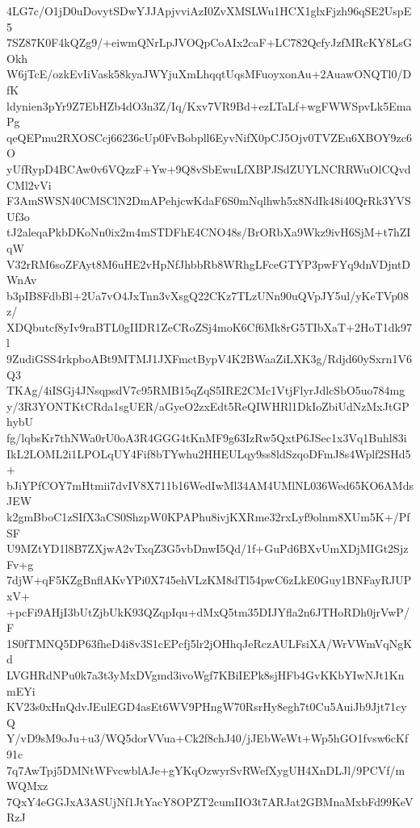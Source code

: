 4LG7c/O1jD0uDovytSDwYJJApjvviAzI0ZvXMSLWu1HCX1glxFjzh96qSE2UspE5
7SZ87K0F4kQZg9/+eiwmQNrLpJVOQpCoAIx2caF+LC782QcfyJzfMRcKY8LsGOkh
W6jTcE/ozkEvIiVask58kyaJWYjuXmLhqqtUqsMFuoyxonAu+2AuawONQTl0/DfK
ldynien3pYr9Z7EbHZb4dO3n3Z/Iq/Kxv7VR9Bd+ezLTaLf+wgFWWSpvLk5EmaPg
qeQEPmu2RXOSCcj66236cUp0FvBobpll6EyvNifX0pCJ5Ojv0TVZEu6XBOY9zc6O
yUfRypD4BCAw0v6VQzzF+Yw+9Q8vSbEwuLfXBPJSdZUYLNCRRWuOlCQvdCMl2vVi
F3AmSWSN40CMSClN2DmAPehjcwKdaF6S0mNqlhwh5x8NdIk48i40QrRk3YVSUf3o
tJ2aleqaPkbDKoNn0ix2m4mSTDFhE4CNO48s/BrORbXa9Wkz9ivH6SjM+t7hZIqW
V32rRM6soZFAyt8M6uHE2vHpNfJhbbRb8WRhgLFceGTYP3pwFYq9dnVDjntDWnAv
b3pIB8FdbBl+2Ua7vO4JxTnn3vXsgQ22CKz7TLzUNn90uQVpJY5ul/yKeTVp08z/
XDQbutcf8yIv9raBTL0gIIDR1ZeCRoZSj4moK6Cf6Mk8rG5TIbXaT+2HoT1dk97l
9ZudiGSS4rkpboABt9MTMJ1JXFmctBypV4K2BWaaZiLXK3g/Rdjd60ySxrn1V6Q3
TKAg/4iISGj4JNsqpsdV7c95RMB15qZqS5IRE2CMc1VtjFlyrJdlcSbO5uo784mg
y/3R3YONTKtCRda1sgUER/aGyeO2zxEdt5ReQIWHRl1DkIoZbiUdNzMxJtGPhybU
fg/lqbsKr7thNWa0rU0oA3R4GGG4tKnMF9g63IzRw5QxtP6JSec1x3Vq1Buhl83i
IkL2LOML2i1LPOLqUY4Fif8bTYwhu2HHEULqy9ss8ldSzqoDFmJ8s4Wplf2SHd5+
bJiYPfCOY7mHtmii7dvIV8X711b16WedIwMl34AM4UMlNL036Wed65KO6AMdsJEW
k2gmBboC1zSIfX3aCS0ShzpW0KPAPhu8ivjKXRme32rxLyf9olnm8XUm5K+/PfSF
U9MZtYD1l8B7ZXjwA2vTxqZ3G5vbDnwI5Qd/1f+GuPd6BXvUmXDjMIGt2SjzFv+g
7djW+qF5KZgBnflAKvYPi0X745ehVLzKM8dTl54pwC6zLkE0Guy1BNFayRJUPxV+
+pcFi9AHjI3bUtZjbUkK93QZqpIqu+dMxQ5tm35DIJYfla2n6JTHoRDh0jrVwP/F
1S0fTMNQ5DP63fheD4i8v3S1cEPcfj5lr2jOHhqJeRczAULFsiXA/WrVWmVqNgKd
LVGHRdNPu0k7a3t3yMxDVgmd3ivoWgf7KBiIEPk8sjHFb4GvKKbYIwNJt1KnmEYi
KV23s0xHnQdvJEulEGD4asEt6WV9PHngW70RsrHy8egh7t0Cu5AuiJb9Jjt71cyQ
Y/vD9sM9oJu+u3/WQ5dorVVua+Ck2f8chJ40/jJEbWeWt+Wp5hGO1fvsw6cKf91c
7q7AwTpj5DMNtWFvcwblAJe+gYKqOzwyrSvRWefXygUH4XnDLJl/9PCVf/mWQMxz
7QxY4eGGJxA3ASUjNf1JtYacY8OPZT2cumIIO3t7ARJat2GBMnaMxbFd99KeVRzJ
